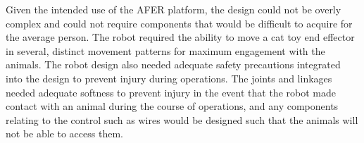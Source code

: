 Given the intended use of the AFER platform, the design could not be overly complex and could not require components that would be difficult to acquire for the average person. The robot required the ability to move a cat toy end effector in several, distinct movement patterns for maximum engagement with the animals. 
The robot design also needed adequate safety precautions integrated into the design to prevent injury during operations. The joints and linkages needed adequate softness to prevent injury in the event that the robot made contact with an animal during the course of operations, and any components relating to the control such as wires would be designed such that the animals will not be able to access them.  